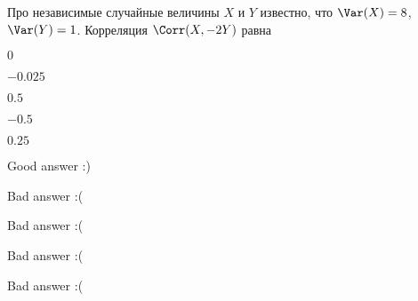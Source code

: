 
\begin{question}
Про независимые случайные величины \(X\) и \(Y\) известно, что
\(\Var(X)=8\), \(\Var(Y)=1\). Корреляция \(\Corr(X,-2Y)\) равна
\begin{answerlist}
  \item \(0\)
  \item \(-0.025\)
  \item \(0.5\)
  \item \(-0.5\)
  \item \(0.25\)
\end{answerlist}
\end{question}

\begin{solution}
\begin{answerlist}
  \item Good answer :)
  \item Bad answer :(
  \item Bad answer :(
  \item Bad answer :(
  \item Bad answer :(
\end{answerlist}
\end{solution}

